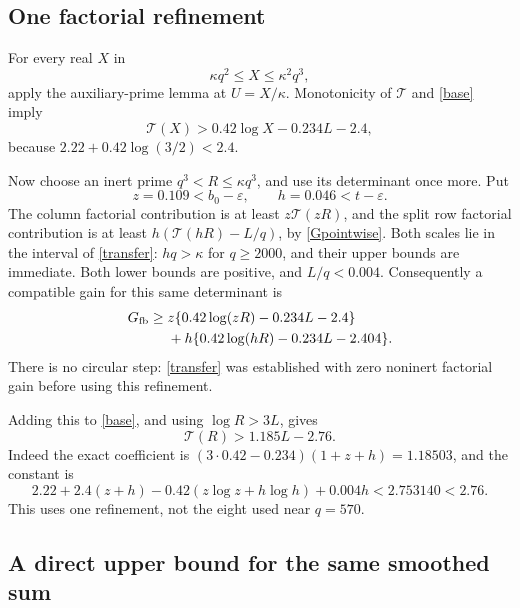 \documentclass[11pt]{article}
\newcommand{\Tn}{\mathcal T}
\newcommand{\eps}{\varepsilon}
\begin{document}
\subsection{One factorial refinement}

For every real $X$ in
\[
 \kappa q^2\le X\le\kappa^2 q^3,
\]
apply the auxiliary-prime lemma at $U=X/\kappa$. Monotonicity of
$\Tn$ and \eqref{base} imply
\begin{equation}\label{transfer}
 \Tn(X)>0.42\log X-0.234L-2.4,
\end{equation}
because $2.22+0.42\log(3/2)<2.4$.

Now choose an inert prime $q^3<R\le\kappa q^3$, and use its
determinant once more. Put
\[
 z=0.109<b_0-\eps,\qquad h=0.046<t-\eps.
\]
The column factorial contribution is at least $z\Tn(zR)$,
and the split row factorial contribution is at least
$h(\Tn(hR)-L/q)$, by \eqref{Gpointwise}.
Both scales lie in the interval of \eqref{transfer}:
$h q>\kappa$ for $q\ge2000$, and their upper bounds are immediate.
Both lower bounds are positive, and $L/q<0.004$.
Consequently a compatible gain for this same determinant is
\begin{align*}
 G_{\rm fb}\ge{}&z\{0.42\log(zR)-0.234L-2.4\}\\
 &+h\{0.42\log(hR)-0.234L-2.404\}.
\end{align*}
There is no circular step: \eqref{transfer} was established with
zero noninert factorial gain before using this refinement.

Adding this to \eqref{base}, and using $\log R>3L$, gives
\begin{equation}\label{final-lower}
 \boxed{\ \Tn(R)>1.185L-2.76.\ }
\end{equation}
Indeed the exact coefficient is
$(3\cdot0.42-0.234)(1+z+h)=1.18503$, and the constant is
\[
 2.22+2.4(z+h)-0.42(z\log z+h\log h)+0.004h
 <2.753140<2.76.
\]
This uses one refinement, not the eight used near $q=570$.

\subsection{A direct upper bound for the same smoothed sum}
\end{document}
